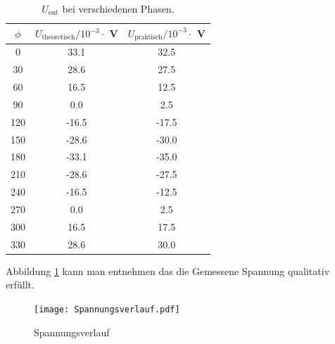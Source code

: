 \begin{table}
  \centering
  \begin{tabular}{c c c}
    \toprule
    $\phi$ & $U_{\text{theoretisch}} / 10^{-3} \cdot $ V & $U_{\text{praktisch}} / 10^{-3} \cdot $ V \\
    \midrule
    0	&  33.1  &  32.5	\\
    30	&  28.6  &  27.5	\\
    60	&  16.5  &  12.5	\\
    90	&  0.0 	 &   2.5	\\
    120	& -16.5  & -17.5	\\
    150	& -28.6  & -30.0	\\
    180	& -33.1  & -35.0	\\
    210	& -28.6  & -27.5	\\
    240	& -16.5  & -12.5	\\
    270	&  0.0 	 &  2.5	 	\\
    300	&  16.5  &  17.5	\\
    330	&  28.6	 &  30.0	\\
  \end{tabular}
  \caption{$U_{\text{out}}$ bei verschiedenen Phasen.}
  \label{tab:Uphase}
\end{table}
Abbildung \ref{fig:Spannungsverlauf} kann man entnehmen das die Gemessene Spannung qualitativ erfüllt.
\begin{figure}
  \centering
  \texttt{[image: Spannungsverlauf.pdf]}
  \caption{Spannungsverlauf}
  \label{fig:Spannungsverlauf}
\end{figure}

